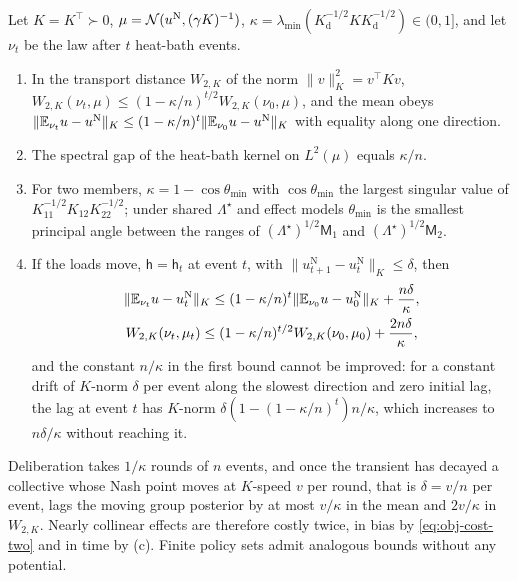 \begin{theorem}\label{thm:obj-time}
Let $K=K^\top\succ0$, $\mu=\mathcal{N}(u^{\mathrm N},(\gamma K)^{-1})$, $\kappa=\lambda_{\min}(K_{\mathrm d}^{-1/2}KK_{\mathrm d}^{-1/2})\in(0,1]$, and let $\nu_t$ be the law after $t$ heat-bath events.
\begin{enumerate}
\item[(a)] In the transport distance $W_{2,K}$ of the norm $\lVert v\rVert_K^2=v^\top Kv$, $W_{2,K}(\nu_t,\mu)\le(1-\kappa/n)^{t/2}W_{2,K}(\nu_0,\mu)$, and the mean obeys $\lVert\mathbb{E}_{\nu_t}u-u^{\mathrm N}\rVert_K\le(1-\kappa/n)^t\lVert\mathbb{E}_{\nu_0}u-u^{\mathrm N}\rVert_K$ with equality along one direction.
\item[(b)] The spectral gap of the heat-bath kernel on $L^2(\mu)$ equals $\kappa/n$.
\item[(c)] For two members, $\kappa=1-\cos\theta_{\min}$ with $\cos\theta_{\min}$ the largest singular value of $K_{11}^{-1/2}K_{12}K_{22}^{-1/2}$; under shared $\Lambda^\star$ and effect models $\theta_{\min}$ is the smallest principal angle between the ranges of $(\Lambda^\star)^{1/2}\mathsf M_1$ and $(\Lambda^\star)^{1/2}\mathsf M_2$.
\item[(d)] If the loads move, $\mathsf h=\mathsf h_t$ at event $t$, with $\lVert u^{\mathrm N}_{t+1}-u^{\mathrm N}_t\rVert_K\le\delta$, then
\begin{equation}\label{eq:obj-tracking}
\begin{gathered}
\lVert\mathbb{E}_{\nu_t}u-u^{\mathrm N}_t\rVert_K\le(1-\kappa/n)^t\lVert\mathbb{E}_{\nu_0}u-u^{\mathrm N}_0\rVert_K+\frac{n\delta}{\kappa},\\
W_{2,K}(\nu_t,\mu_t)\le(1-\kappa/n)^{t/2}W_{2,K}(\nu_0,\mu_0)+\frac{2n\delta}{\kappa},
\end{gathered}
\end{equation}
and the constant $n/\kappa$ in the first bound cannot be improved: for a constant drift of $K$-norm $\delta$ per event along the slowest direction and zero initial lag, the lag at event $t$ has $K$-norm $\delta(1-(1-\kappa/n)^t)n/\kappa$, which increases to $n\delta/\kappa$ without reaching it.
\end{enumerate}
\end{theorem}

Deliberation takes $1/\kappa$ rounds of $n$ events, and once the transient has decayed a collective whose Nash point moves at $K$-speed $v$ per round, that is $\delta=v/n$ per event, lags the moving group posterior by at most $v/\kappa$ in the mean and $2v/\kappa$ in $W_{2,K}$. Nearly collinear effects are therefore costly twice, in bias by \eqref{eq:obj-cost-two} and in time by (c). Finite policy sets admit analogous bounds without any potential.

